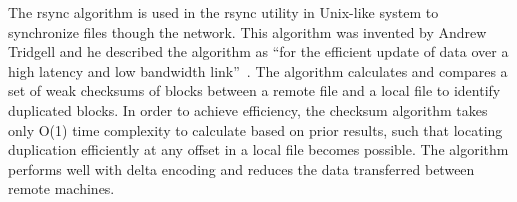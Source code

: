     The rsync algorithm is used in the rsync utility in Unix-like system to synchronize files though the network. This algorithm was invented by Andrew Tridgell and he described the algorithm as ``for the efficient update of data over a high latency and low bandwidth link''~\cite{rsync_alg}. The algorithm calculates and compares a set of weak checksums of blocks between a remote file and a local file to identify duplicated blocks. In order to achieve efficiency, the checksum algorithm takes only O(1) time complexity to calculate based on prior results, such that locating duplication efficiently at any offset in a local file becomes possible. The algorithm performs well with delta encoding and reduces the data transferred between remote machines.

